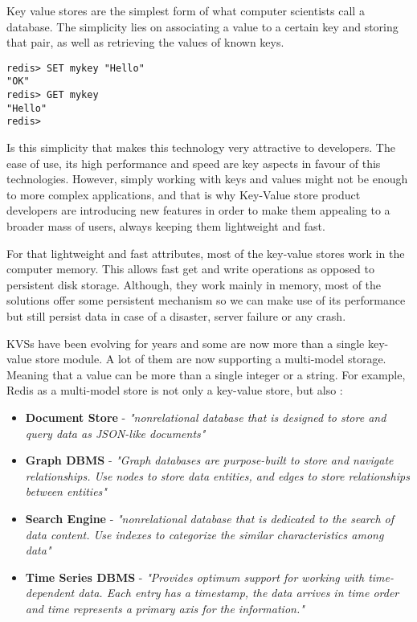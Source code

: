 Key value stores are the simplest form of what computer scientists call a database. The simplicity lies on associating a value to a certain key and storing that pair, as well as retrieving the values of known keys. \cite{db-engine:1}

\lstset{language=Bash, caption=Redis Set \& Get, label=lst:redisSetGet}
\begin{lstlisting}
redis> SET mykey "Hello"
"OK"
redis> GET mykey
"Hello"
redis> 
\end{lstlisting}

Is this simplicity that makes this technology very attractive to developers. The ease of use, its high performance and speed are key aspects in favour of this technologies. However, simply working with keys and values might not be enough to more complex applications, and that is why Key-Value store product developers are introducing new features in order to make them appealing to a broader mass of users, always keeping them lightweight and fast.

For that lightweight and fast attributes, most of the key-value stores work in the computer memory. This allows fast get and write operations as opposed to persistent disk storage. Although, they work mainly in memory, most of the solutions offer some persistent mechanism so we can make use of its performance but still persist data in case of a disaster, server failure or any crash.

\gls{KVS}s have been evolving for years and some are now more than a single key-value store module. A lot of them are now supporting a multi-model storage. Meaning that a value can be more than a single integer or a string. For example, Redis \cite{redis:1} as a multi-model store is not only a key-value store, but also \cite{redis:2}:

\begin{itemize}
	\item \textbf{Document Store} - \textit{"nonrelational database that is designed to store and query data as JSON-like documents"} \cite{aws-nosql:1}
	\item \textbf{Graph \gls{DBMS}} - \textit{"Graph databases are purpose-built to store and navigate relationships. Use nodes to store data entities, and edges to store relationships between entities"} \cite{aws-nosql:2} 
	\item \textbf{Search Engine} - \textit{"nonrelational database that is dedicated to the search of data content. Use indexes to categorize the similar characteristics among data"} \cite{aws-nosql:3} 
	\item \textbf{Time Series \gls{DBMS}} - \textit{"Provides optimum support for working with time-dependent data. Each entry has a timestamp, the data arrives in time order and time represents a primary axis for the information."} \cite{timeSeries:1}
\end{itemize}

